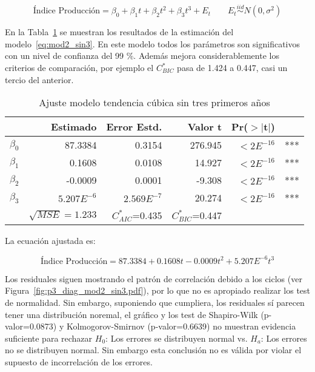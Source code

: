 \documentclass{tufte-handout}
\begin{document}
\begin{equation} \label{eq:mod2_sin3}
	\text{Índice Producción} = \beta_0 + \beta_1 t + \beta_2 t^2 + \beta_3 t^3 + E_t
	\qquad E_t \stackrel{iid}{\sim} N(0, \sigma^2)
\end{equation}

En la Tabla~\ref{tab:mod2_sin3} se muestran los resultados de la estimación del modelo~\ref{eq:mod2_sin3}. En este modelo todos los parámetros son significativos con un nivel de confianza del 99 \%. Además mejora considerablemente los criterios de comparación, por ejemplo el $C^{*}_{BIC}$ pasa de 1.424 a 0.447, casi un tercio del anterior.

\begin{table}[ht]
\centering
\begin{tabular}{lrrrrl}
          & Estimado & Error Estd. & Valor t & Pr($>$$|$t$|$) & \\ 
  \hline
$\beta_0$ & 87.3384 & 0.3154 & 276.945 & $<2E^{-16}$ & *** \\ 
  $\beta_1$ & 0.1608 & 0.0108 & 14.927 & $<2E^{-16}$ & *** \\ 
  $\beta_2$ & -0.0009 & 0.0001 & -9.308 & $<2E^{-16}$ & *** \\ 
  $\beta_3$ & $5.207E^{-6}$ & $2.569E^{-7}$ & 20.274 & $<2E^{-16}$ & *** \\ 
   \hline
   & $\sqrt{MSE}=1.233$ & $C^{*}_{AIC}$=0.435 & $C^{*}_{BIC}$=0.447 & \\
   \hline
\end{tabular}
\caption{Ajuste modelo tendencia cúbica sin tres primeros años} 
\label{tab:mod2_sin3}
\end{table}

La ecuación ajustada es:

\begin{equation}
	\text{Índice Producción} = 87.3384 + 0.1608 t - 0.0009 t^2 + 5.207E^{-6} t^3
\end{equation}

Los residuales siguen mostrando el patrón de correlación debido a los ciclos (ver Figura~\ref{fig:p3_diag_mod2_sin3.pdf}), por lo que no es apropiado realizar los test de normalidad. Sin embargo, suponiendo que cumpliera, los residuales sí parecen tener una distribución noremal, el gráfico y los test de Shapiro-Wilk (p-valor=0.0873) y Kolmogorov-Smirnov (p-valor=0.6639) no muestran evidencia suficiente para rechazar $H_0$: Los errores se distribuyen normal vs. $H_a$: Los errores no se distribuyen normal. Sin embargo esta conclusión no es válida por violar el supuesto de incorrelación de los errores.
\end{document}
